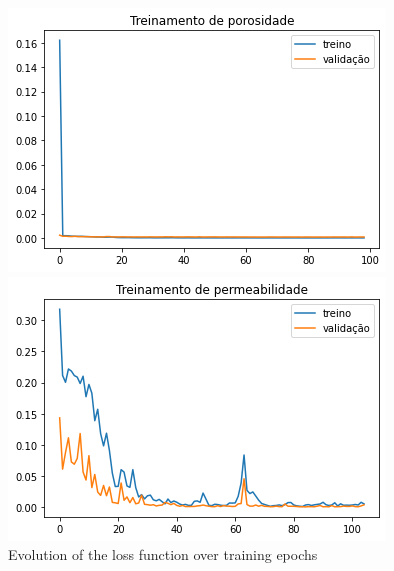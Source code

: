 \documentclass[a4paper,fleqn]{cas-sc}
\begin{document}
\begin{figure}[h!]
	\caption{Evolution of the loss function over training epochs}
	\label{fig:history}
	\centering%
	\begin{minipage}{0.45\textwidth}
		\includegraphics[width=\textwidth]{images/poro_train.png}
	\end{minipage}
	\begin{minipage}{0.45\textwidth}
		\includegraphics[width=\textwidth]{images/perm_train.png}
	\end{minipage}	
\end{figure}
\end{document}
